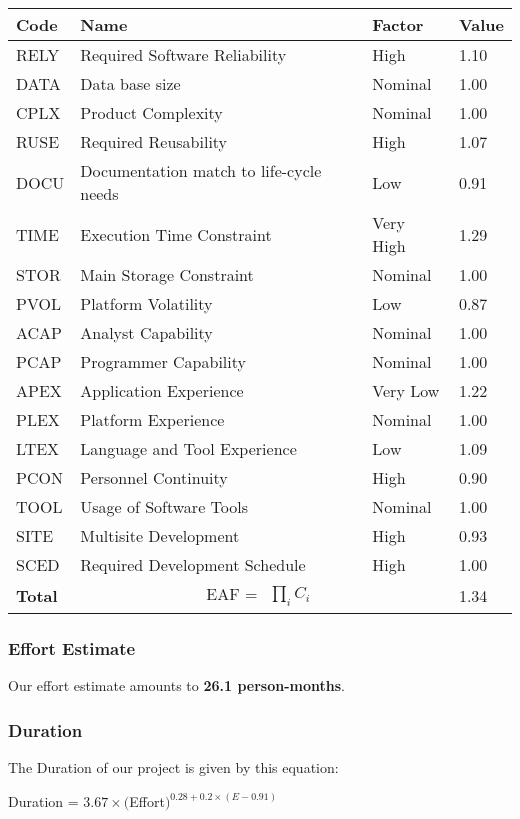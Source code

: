 	\begin{tabular}{|l|l|l|l|}
	\hline
	\textbf{Code} & \textbf{Name} & \textbf{Factor} & \textbf{Value}\\
	\hline
	RELY & Required Software Reliability			& High 	&		1.10\\
	\hline
	DATA & Data base size 							& Nominal &		1.00\\
	\hline
	CPLX & Product Complexity 						& Nominal &		1.00\\
	\hline
	RUSE& Required Reusability 						& High &		1.07\\
	\hline
	DOCU & Documentation match to life-cycle needs 	& Low & 		0.91\\
	\hline
	TIME & Execution Time Constraint 				& Very High &	1.29\\
	\hline
	STOR & Main Storage Constraint 					& Nominal &		1.00\\
	\hline
	PVOL & Platform Volatility 						& Low & 		0.87\\
	\hline
	ACAP & Analyst Capability 						& Nominal & 	1.00\\
	\hline
	PCAP & Programmer Capability 					& Nominal &		1.00\\
	\hline
	APEX & Application Experience 					& Very Low &	1.22\\
	\hline
	PLEX & Platform Experience 						& Nominal &		1.00\\
	\hline
	LTEX & Language and Tool Experience 			& Low & 		1.09\\
	\hline
	PCON & Personnel Continuity 					& High & 		0.90\\
	\hline
	TOOL & Usage of Software Tools 					& Nominal &		1.00\\
	\hline
	SITE & Multisite Development 					& High &		0.93\\
	\hline
	SCED & Required Development Schedule 			& High &		1.00\\
	\hline
	\textbf{Total} & \multicolumn{2}{|c|}{EAF = $\begin{matrix} \prod_{i} C_i \end{matrix}$} & 1.34 \\
	\hline
	\end{tabular}
	
	
\subsubsection{Effort Estimate}
	Our effort estimate amounts to \textbf{26.1 person-months}.  
	
\newpage
\subsubsection{Duration}
	The Duration of our project is given by this equation:\\
	\begin{center}
	
	Duration = $ 3.67 \times  ($Effort$)^{0.28 + 0.2 \times (E-0.91)} $ \\
	
	\end{center}
	
